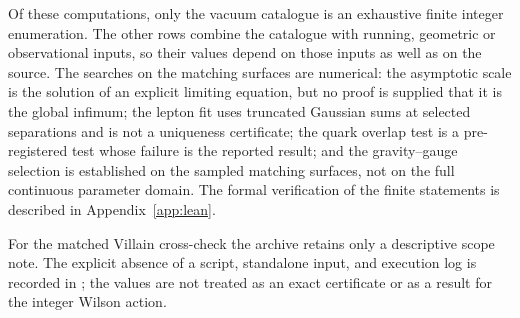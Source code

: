 \par\vspace{0.7em}

Of these computations, only the vacuum catalogue is an exhaustive finite
integer enumeration. The other rows combine the catalogue with running,
geometric or observational inputs, so their values depend on those inputs as
well as on the source. The searches on the matching surfaces are numerical:
the asymptotic scale is the solution of an explicit limiting equation, but no
proof is supplied that it is the global infimum; the lepton fit uses truncated
Gaussian sums at selected separations and is not a uniqueness certificate; the
quark overlap test is a pre-registered test whose failure is the reported
result; and the gravity--gauge selection is established on the sampled
matching surfaces, not on the full continuous parameter domain. The formal
verification of the finite statements is described in
Appendix~\ref{app:lean}.

For the matched Villain cross-check the archive retains only a descriptive
scope note. The explicit absence of a script, standalone input, and execution
log is recorded in
;
the values are not treated as an exact certificate or as a result for the
integer Wilson action.

